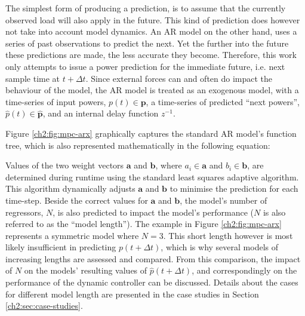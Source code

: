 The simplest form of producing a prediction, is to assume that the currently observed load will also apply in the future.
This kind of prediction does however not take into account model dynamics.
An AR model on the other hand, uses a series of past observations to predict the next.
Yet the further into the future these predictions are made, the less accurate they become.
Therefore, this work only attempts to issue a power prediction for the immediate future, i.e. next sample time at $t+\Delta t$.
Since external forces can and often do impact the behaviour of the model, the AR model is treated as an exogenous model, with a time-series of input powers, $p(t) \in \textbf{p}$, a time-series of predicted ``next powers'', $\hat{p}(t) \in \hat{\textbf{p}}$, and an internal delay function $z^{-1}$.



Figure \ref{ch2:fig:mpc-arx} graphically captures the standard AR model's function tree, which is also represented mathematically in the following equation:



Values of the two weight vectors $\textbf{a}$ and $\textbf{b}$, where $a_i \in \textbf{a}$ and $b_i \in \textbf{b}$, are determined during runtime using the standard least squares adaptive algorithm.
This algorithm dynamically adjusts $\textbf{a}$ and $\textbf{b}$ to minimise the prediction for each time-step.
Beside the correct values for $\textbf{a}$ and $\textbf{b}$, the model's number of regressors, $N$, is also predicted to impact the model's performance ($N$ is also referred to as the ``model length'').
The example in Figure \ref{ch2:fig:mpc-arx} represents a symmetric model where $N=3$.
This short length however is most likely insufficient in predicting $p(t+\Delta t)$, which is why several models of increasing lengths are assessed and compared.
From this comparison, the impact of $N$ on the models' resulting values of $\hat{p}(t+\Delta t)$, and correspondingly on the performance of the dynamic controller can be discussed.
Details about the cases for different model length are presented in the case studies in Section \ref{ch2:sec:case-studies}.










